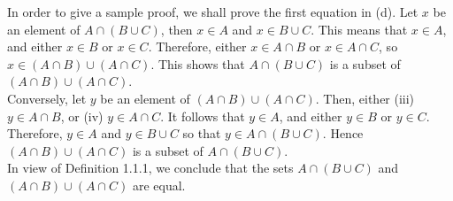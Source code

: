 In order to give a sample proof, we shall prove the first equation in (d).
Let $x$ be an element of $A\cap (B\cup C)$, then $x\in A$ and $x\in
B\cup C$.  This means that $x\in A$, and either $x\in B$ or $x\in C$.
Therefore, either $x\in A\cap B$ or $x\in A\cap C$, so $x\in
(A\cap B) \cup (A\cap C)$.  This shows that $A\cap (B\cup C)$ is a
subset of $(A\cap
B)\cup (A\cap C)$.\\

Conversely, let $y$ be an element of $(A\cap B)\cup (A\cap C)$. Then,
either (iii) $y\in A\cap B$, or (iv) $y\in A\cap C$.  It follows that
$y\in A$, and either $y\in B$ or $y\in C$. Therefore, $y\in A$ and $y\in
B\cup C$ so that $y\in A \cap (B\cup C)$. Hence $(A\cap B) \cup
(A\cap C)$ is a subset of
$A\cap (B\cup C)$.\\

In view of Definition 1.1.1, we conclude that the sets $A\cap (B\cup C)$
and $(A \cap B) \cup (A\cap C)$ are equal.  
